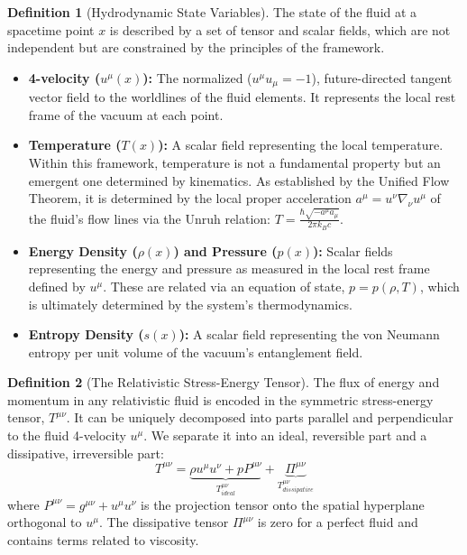 \documentclass[11pt, letterpaper]{report}
\theoremstyle{plain} %
\theoremstyle{definition} %
\newtheorem{definition}{Definition}[chapter]
\theoremstyle{remark} %
\begin{document}
\begin{definition}[Hydrodynamic State Variables]
The state of the fluid at a spacetime point $x$ is described by a set of tensor and scalar fields, which are not independent but are constrained by the principles of the framework.
\begin{itemize}
    \item \textbf{4-velocity ($u^\mu(x)$):} The normalized ($u^\mu u_\mu = -1$), future-directed tangent vector field to the worldlines of the fluid elements. It represents the local rest frame of the vacuum at each point.
    \item \textbf{Temperature ($T(x)$):} A scalar field representing the local temperature. Within this framework, temperature is not a fundamental property but an emergent one determined by kinematics. As established by the Unified Flow Theorem, it is determined by the local proper acceleration $a^\mu = u^\nu \nabla_\nu u^\mu$ of the fluid's flow lines via the Unruh relation: $T = \frac{\hbar \sqrt{-a^\mu a_\mu}}{2\pi k_B c}$.
    \item \textbf{Energy Density ($\rho(x)$) and Pressure ($p(x)$):} Scalar fields representing the energy and pressure as measured in the local rest frame defined by $u^\mu$. These are related via an equation of state, $p=p(\rho, T)$, which is ultimately determined by the system's thermodynamics.
    \item \textbf{Entropy Density ($s(x)$):} A scalar field representing the von Neumann entropy per unit volume of the vacuum's entanglement field.
\end{itemize}
\end{definition}

\begin{definition}[The Relativistic Stress-Energy Tensor]
The flux of energy and momentum in any relativistic fluid is encoded in the symmetric stress-energy tensor, $T^{\mu\nu}$. It can be uniquely decomposed into parts parallel and perpendicular to the fluid 4-velocity $u^\mu$. We separate it into an ideal, reversible part and a dissipative, irreversible part:
\begin{equation}
    T^{\mu\nu} = \underbrace{\rho u^\mu u^\nu + p P^{\mu\nu}}_{\text{$T^{\mu\nu}_{ideal}$}} + \underbrace{\Pi^{\mu\nu}}_{\text{$T^{\mu\nu}_{dissipative}$}}
    \label{eq:stress_energy_decomposition}
\end{equation}
where $P^{\mu\nu} = g^{\mu\nu} + u^\mu u^\nu$ is the projection tensor onto the spatial hyperplane orthogonal to $u^\mu$. The dissipative tensor $\Pi^{\mu\nu}$ is zero for a perfect fluid and contains terms related to viscosity.
\end{definition}
\end{document}
